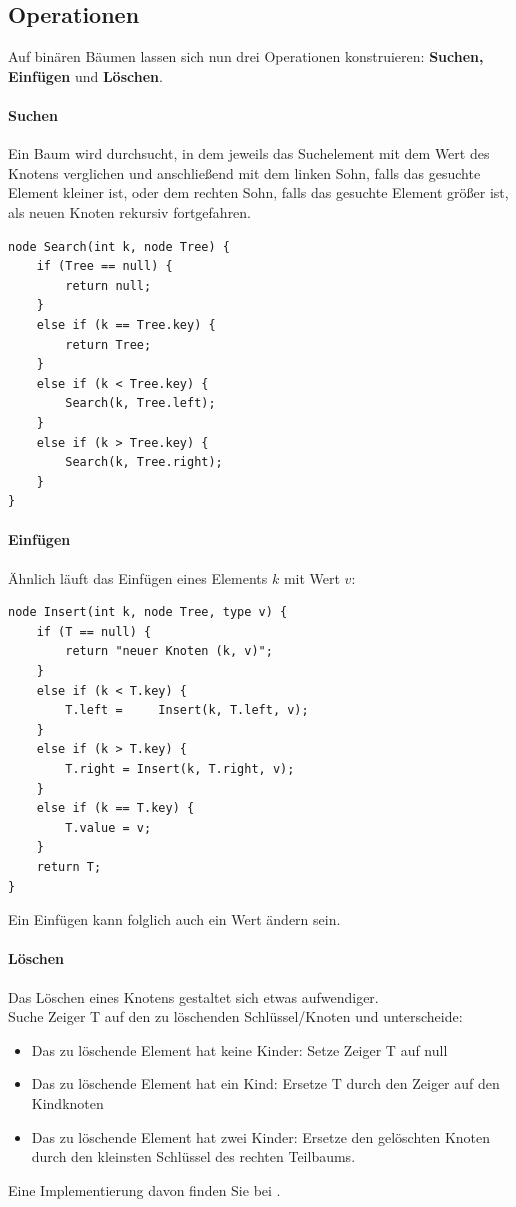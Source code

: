 \documentclass[11pt,a4paper]{scrartcl}
\begin{document}
\subsection{Operationen}
Auf binären Bäumen lassen sich nun drei Operationen konstruieren: \textbf{Suchen, Einfügen} und \textbf{Löschen}.
\paragraph{Suchen}
Ein Baum wird durchsucht, in dem jeweils das Suchelement mit dem Wert des Knotens verglichen und anschließend mit dem linken Sohn, falls das gesuchte Element kleiner ist, oder dem rechten Sohn, falls das gesuchte Element größer ist, als neuen Knoten rekursiv fortgefahren.
\begin{lstlisting}
node Search(int k, node Tree) {
	if (Tree == null) {
		return null;	
	}
	else if (k == Tree.key) {
		return Tree;	
	}
	else if (k < Tree.key) {
		Search(k, Tree.left);	
	}
	else if (k > Tree.key) {
		Search(k, Tree.right);	
	}
}
\end{lstlisting}
\paragraph{Einfügen}
Ähnlich läuft das Einfügen eines Elements $k$ mit Wert $v$: 
\begin{lstlisting}
node Insert(int k, node Tree, type v) {
	if (T == null) {
		return "neuer Knoten (k, v)";	
	}
	else if (k < T.key) {
		T.left =	 Insert(k, T.left, v);
	}
	else if (k > T.key) {
		T.right = Insert(k, T.right, v);	
	}
	else if (k == T.key) {
		T.value = v;
	}
	return T;
}
\end{lstlisting}
Ein Einfügen kann folglich auch ein {\glqq}Wert ändern{\grqq} sein.
\paragraph{Löschen}
Das Löschen eines Knotens gestaltet sich etwas aufwendiger. \\
Suche Zeiger T auf den zu löschenden Schlüssel/Knoten und unterscheide:
\begin{itemize}
\item Das zu löschende Element hat keine Kinder: Setze Zeiger T auf null
\item Das zu löschende Element hat ein Kind: Ersetze T durch den Zeiger auf den Kindknoten
\item Das zu löschende Element hat zwei Kinder: Ersetze den gelöschten Knoten durch den kleinsten Schlüssel des rechten Teilbaums.
\end{itemize}
Eine Implementierung davon finden Sie bei \parencite{Wirth}.
\end{document}
